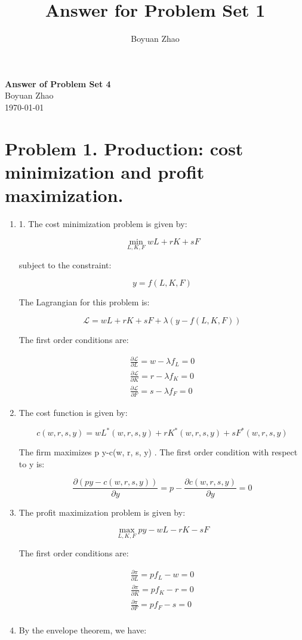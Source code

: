 \documentclass[UTF8,titlepage]{article}
\title{Answer for Problem Set 1}
\author{Boyuan Zhao}
\numberwithin{figure}{section}
\begin{document}
\begin{center}
    {\LARGE \textbf{Answer of Problem Set 4}}\\  %
    {\normalsize Boyuan Zhao}\\  %
    {\small \today}  %
\end{center}
\section{Problem 1. Production: cost minimization and profit maximization.}
\begin{enumerate}
    \item 1. The cost minimization problem is given by:

    \[\min _{L, K, F} w L+r K+s F\]
    
    subject to the constraint:
    
    \[y=f(L, K, F)\]
    
    The Lagrangian for this problem is:
    
    \[\mathcal{L}=w L+r K+s F+\lambda(y-f(L, K, F))\]
    
    The first order conditions are:
    
    \begin{align*}
    \frac{\partial \mathcal{L}}{\partial L}=w-\lambda f_{L}=0 \\
    \frac{\partial \mathcal{L}}{\partial K}=r-\lambda f_{K}=0 \\
    \frac{\partial \mathcal{L}}{\partial F}=s-\lambda f_{F}=0
    \end{align*}
    \item The cost function is given by:

    \[c(w, r, s, y)=w L^{*}(w, r, s, y)+r K^{*}(w, r, s, y)+s F^{*}(w, r, s, y)\]
    
    The firm maximizes  p y-c(w, r, s, y) . The first order condition with respect to  y  is:
    
    \[\frac{\partial(p y-c(w, r, s, y))}{\partial y}=p-\frac{\partial c(w, r, s, y)}{\partial y}=0\]
    
    \item The profit maximization problem is given by:

    \[\max _{L, K, F} p y-w L-r K-s F\]
    
    The first order conditions are:
    
    \begin{align*}
        \frac{\partial \pi}{\partial L}=p f_{L}-w=0 \\
        \frac{\partial \pi}{\partial K}=p f_{K}-r=0 \\
        \frac{\partial \pi}{\partial F}=p f_{F}-s=0 \\
    \end{align*}
    \item By the envelope theorem, we have:


\end{enumerate}
\end{document}
